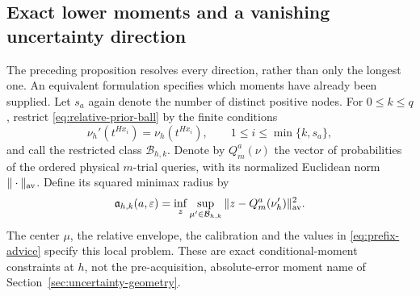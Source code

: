 \subsection{Exact lower moments and a vanishing uncertainty direction}
The preceding proposition resolves every direction, rather than only
the longest one. An equivalent formulation specifies which moments have
already been supplied. Let $s_a$ again denote the number of distinct
positive nodes. For $0\le k\le q$, restrict
\eqref{eq:relative-prior-ball} by the finite conditions
\begin{equation}\label{eq:prefix-advice}
 \nu_h'(t^{Hx_i})=\nu_h(t^{Hx_i}),
                 \qquad 1\le i\le\min\{k,s_a\},
\end{equation}
and call the restricted class $\mathcal B_{h,k}$. Denote by
$Q_m^a(\nu)$ the vector of probabilities of the ordered physical
$m$-trial queries, with its normalized Euclidean norm $\|\cdot\|_{\rm av}$.
Define its squared minimax radius by
\[
 \mathfrak a_{h,k}(a,\varepsilon)=
 \inf_z\sup_{\mu'\in\mathcal B_{h,k}}
       \|z-Q_m^a(\nu_h')\|_{\rm av}^2.
\]
The center $\mu$, the relative envelope, the calibration and the values
in \eqref{eq:prefix-advice} specify this local problem. These are exact
conditional-moment constraints at $h$, not the pre-acquisition,
absolute-error moment name of Section~\ref{sec:uncertainty-geometry}.

